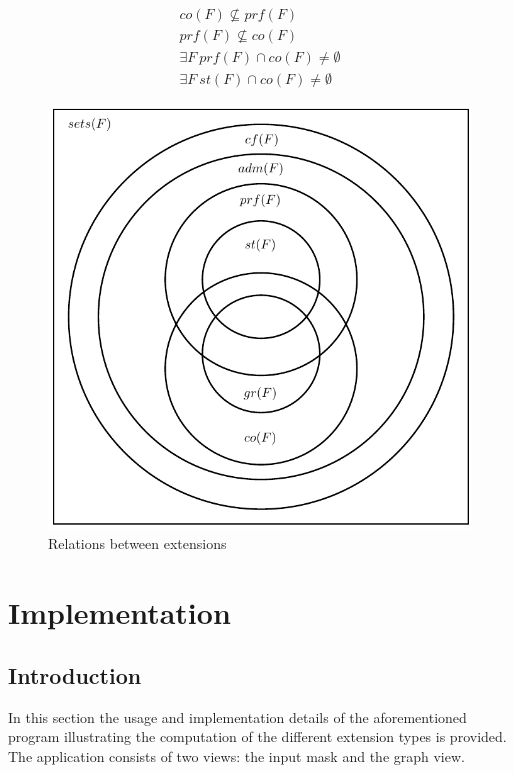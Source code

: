 \documentclass[draft,final]{vutinfth} %
\begin{document}

\begin{align}
	co(F)\not\subseteq prf(F)\\
	prf(F)\not\subseteq co(F)\\
	\exists F\ prf(F)\cap co(F) \not = \emptyset\\
	\exists F\ st(F)\cap co(F) \not = \emptyset 
\end{align}

\FloatBarrier
	\begin{figure}[!htb]
		\centering
		\includegraphics{pics/diagram.pdf}
		\caption{Relations between extensions}
	\end{figure}
\FloatBarrier

\chapter{Implementation}

\section{Introduction}
In this section the usage and implementation details of the aforementioned program illustrating the computation of the different extension types is provided. The application consists of two views: the input mask and the graph view.
\end{document}

